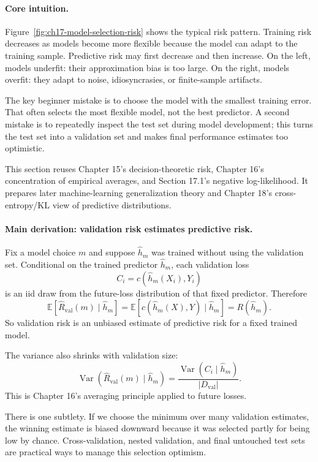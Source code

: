 \paragraph{Core intuition.}
Figure~\ref{fig:ch17-model-selection-risk} shows the typical risk pattern. Training risk decreases as models become more flexible because the model can adapt to the training sample. Predictive risk may first decrease and then increase. On the left, models underfit: their approximation bias is too large. On the right, models overfit: they adapt to noise, idiosyncrasies, or finite-sample artifacts.

The key beginner mistake is to choose the model with the smallest training error. That often selects the most flexible model, not the best predictor. A second mistake is to repeatedly inspect the test set during model development; this turns the test set into a validation set and makes final performance estimates too optimistic.

This section reuses Chapter 15's decision-theoretic risk, Chapter 16's concentration of empirical averages, and Section 17.1's negative log-likelihood. It prepares later machine-learning generalization theory and Chapter 18's cross-entropy/KL view of predictive distributions.

\paragraph{Main derivation: validation risk estimates predictive risk.}
Fix a model choice \(m\) and suppose \(\hat h_m\) was trained without using the validation set. Conditional on the trained predictor \(\hat h_m\), each validation loss
\[
C_i=c(\hat h_m(X_i),Y_i)
\]
is an iid draw from the future-loss distribution of that fixed predictor. Therefore
\[
\mathbb E[\hat R_{\mathrm{val}}(m)\mid \hat h_m]
=
\mathbb E[c(\hat h_m(X),Y)\mid \hat h_m]
=R(\hat h_m).
\]
So validation risk is an unbiased estimate of predictive risk for a fixed trained model.

The variance also shrinks with validation size:
\[
\operatorname{Var}(\hat R_{\mathrm{val}}(m)\mid\hat h_m)
=
\frac{\operatorname{Var}(C_i\mid\hat h_m)}{|D_{\mathrm{val}}|}.
\]
This is Chapter 16's averaging principle applied to future losses.

There is one subtlety. If we choose the minimum over many validation estimates, the winning estimate is biased downward because it was selected partly for being low by chance. Cross-validation, nested validation, and final untouched test sets are practical ways to manage this selection optimism.

